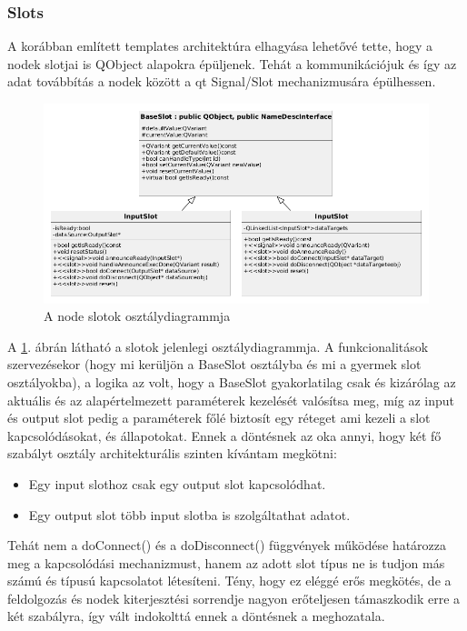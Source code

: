 \documentclass[a4paper,12pt,oneside]{report}
\begin{document}
\subsubsection{Slots}
A korábban említett templates architektúra elhagyása lehetővé tette, hogy a nodek slotjai is QObject alapokra épüljenek. Tehát a kommunikációjuk és így az adat továbbítás a nodek között a qt Signal/Slot mechanizmusára épülhessen.
\begin{center}
\begin{figure}[h]
  \includegraphics[width=1.1\textwidth]{slot_diag.png}
  \caption{A node slotok osztálydiagrammja }

  \label{fig:bimg_slot_diag}
\end{figure}
\end{center}
A \ref{fig:bimg_slot_diag}. ábrán látható a slotok jelenlegi osztálydiagrammja. A funkcionalitások szervezésekor (hogy mi kerüljön a BaseSlot osztályba és mi a gyermek slot osztályokba), a logika az volt, hogy a BaseSlot gyakorlatilag csak és kizárólag az aktuális és az alapértelmezett paraméterek kezelését valósítsa meg, míg az input és output slot pedig a paraméterek főlé biztosít egy réteget ami kezeli a slot kapcsolódásokat, és állapotokat. Ennek a döntésnek az oka annyi, hogy két fő szabályt osztály architekturális szinten kívántam megkötni:
\begin{itemize}
	\itemsep0em
	\item Egy input slothoz csak egy output slot kapcsolódhat.
	\item Egy output slot több input slotba is szolgáltathat adatot.
\end{itemize}
Tehát nem a doConnect() és a doDisconnect() függvények működése határozza meg a kapcsolódási mechanizmust, hanem az adott slot típus ne is tudjon más számú és típusú kapcsolatot létesíteni. Tény, hogy ez eléggé erős megkötés, de a feldolgozás és nodek kiterjesztési sorrendje nagyon erőteljesen támaszkodik erre a két szabályra, így vált indokolttá ennek a döntésnek a meghozatala.
\end{document}

